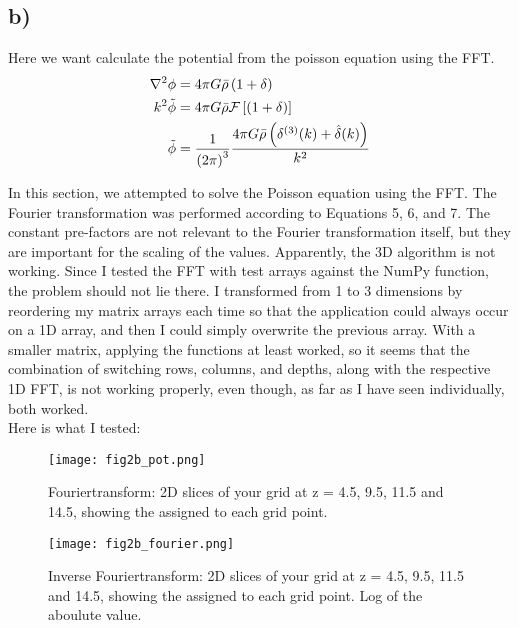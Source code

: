\subsection{b)}
Here we want calculate the potential from the poisson equation using the FFT. 
\begin{align}
    \nabla^2\phi &= 4 \pi G \Bar{\rho} \left({1+ \delta}\right)\\
    k^2 \Tilde{\phi} &= 4\pi G \Bar{\rho} \mathcal{F}\left[\left({1+\delta}\right)\right] \\
     \Tilde{\phi} &= \frac{1}{\left({2 \pi}\right)^3}\frac{4\pi G \Bar{\rho} \left({\delta^{(3)}(k) + \hat{\delta}(k)}\right)}{k^2}
\end{align}


In this section, we attempted to solve the Poisson equation using the FFT. The Fourier transformation was performed according to Equations 5, 6, and 7. The constant pre-factors are not relevant to the Fourier transformation itself, but they are important for the scaling of the values. Apparently, the 3D algorithm is not working. Since I tested the FFT with test arrays against the NumPy function, the problem should not lie there. I transformed from 1 to 3 dimensions by reordering my matrix arrays each time so that the application could always occur on a 1D array, and then I could simply overwrite the previous array. With a smaller matrix, applying the functions at least worked, so it seems that the combination of switching rows, columns, and depths, along with the respective 1D FFT, is not working properly, even though, as far as I have seen individually, both worked.\\
Here is what I tested:


\begin{figure}[h!]
    \centering
    \texttt{[image: fig2b\_pot.png]}
    \caption{Fouriertransform: 2D slices of your grid at z = 4.5, 9.5, 11.5 and
    14.5, showing the assigned to each grid point.}
\end{figure}


\begin{figure}[h!]
    \centering
    \texttt{[image: fig2b\_fourier.png]}
    \caption{Inverse Fouriertransform: 2D slices of your grid at z = 4.5, 9.5, 11.5 and
    14.5, showing the assigned to each grid point. Log of the aboulute value.}
\end{figure}






